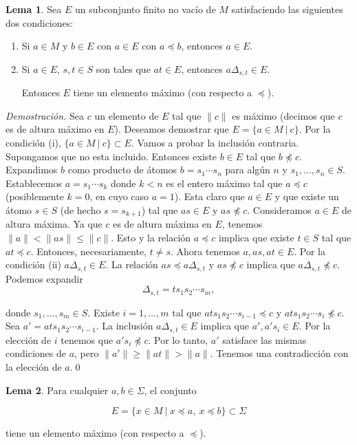 \documentclass[12pt]{article}
\theoremstyle{definition}
\newtheorem{lema}{Lema}[section]
\providecommand{\norm}[1]{\lVert#1\rVert}
\begin{document}
\begin{lema}
Sea $E$ un subconjunto finito no vacío de $M$ satisfaciendo las siguientes dos condiciones:
\begin{enumerate}[label=(\roman*).]
\item Si $a\in M$ y $b\in E$ con $a\in E$ con $a\preceq b$, entonces $a\in E$.
\item Si $a\in E$, $s,t\in S$ son tales que $at\in E$, entonces $a\Delta_{s,t}\in E$.

Entonces $E$ tiene un elemento máximo (con respecto a $\preceq$).
\end{enumerate}
\label{lema:garside1}
\end{lema}

\textit{Demostración.} Sea $c$ un elemento de $E$ tal que $\norm{c}$ es máximo (decimos que $c$ es de altura máximo en $E$). Deseamos demostrar que $E=\{a\in M\ |\ c\}$. Por la condición (i), $\{a\in M\ |\ c\}\subset E$. Vamos a probar la inclusión contraria. Supongamos que no esta incluido. Entonces existe $b\in E$ tal que $b\npreceq c$. Expandimos $b$ como producto de átomos $b=s_1\cdots s_n$ para algún $n$ y $s_1,\ldots,s_n\in S$. Establecemos $a=s_1\cdots s_k$ donde $k < n$ es el entero máximo tal que $a\preceq c$ (posiblemente $k=0$, en cuyo caso $a=1$). Esta claro que $a\in E$ y que existe un átomo $s\in S$ (de hecho $s=s_{k+1}$) tal que $as\in E$ y $as\npreceq c$. Consideramos $a\in E$ de altura máxima. Ya que $c$ es de altura máxima en $E$, tenemos $\norm{a}<\norm{as}\leq \norm{c}$. Esto y la relación $a\preceq c$ implica que existe $t\in S$ tal que $at\preceq c$. Entonces, necesariamente, $t\neq s$. Ahora tenemos  $a,as, at\in E$. Por la condición (ii) $a\Delta_{s,t}\in E$. La relación $as\preceq a\Delta_{s,t}$ y $as\npreceq c$ implica que $a\Delta_{s,t}\npreceq c$. Podemos expandir
$$\Delta_{s,t}=ts_1s_2\cdots s_m,$$

donde $s_1,\ldots,s_m\in S$. Existe $i=1,\ldots,m$ tal que $ats_1s_2\cdots s_{i-1}\preceq c$ y $ats_1s_2\cdots s_{i}\npreceq c$. Sea $a'=ats_1s_2\cdots s_{i-1}$. La inclusión $a\Delta_{s,t}\in E$ implica que $a',a's_i\in E$. Por la elección de $i$ tenemos que $a's_i\npreceq c$. Por lo tanto, $a'$ satisface las mismas condiciones de $a$, pero $\norm{a'}\geq \norm{at}> \norm{a}$. Tenemos una contradicción con la elección de $a$.\qed

\begin{lema}
Para cualquier $a,b\in\Sigma$, el conjunto

$$E=\{x\in M\ |\ x\preceq a,\ x\preceq b\}\subset \Sigma$$

tiene un elemento máximo (con respecto a $\preceq$).
\label{lema:garside2}
\end{lema}
\end{document}
